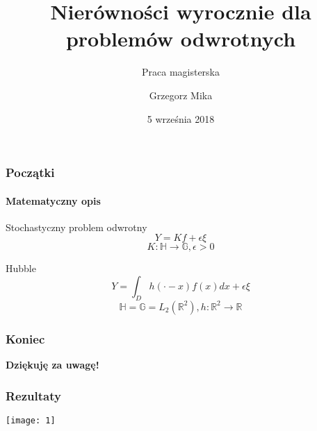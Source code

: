 \documentclass{beamer}
\title{Nierówności wyrocznie dla problemów odwrotnych}
\subtitle{Praca magisterska}
\author{Grzegorz Mika}
\institute{Wydział Matematyki Stosowanej}
\date{5 września 2018}
\begin{document}
\titleframe[pl]


\begin{frame}\frametitle{Początki}\framesubtitle{Matematyczny opis}

\begin{block}{Stochastyczny problem odwrotny}
\begin{displaymath}
Y=Kf+\epsilon\xi
\end{displaymath}
\begin{displaymath}
K\colon \mathbb{H}\to \mathbb{G}, \epsilon>0
\end{displaymath}
\end{block}
\begin{block}{Hubble}
\begin{displaymath}
Y=\int_Dh(\cdot-x)f(x)dx+\epsilon\xi
\end{displaymath}
\begin{displaymath}
\mathbb{H}= \mathbb{G}=L_2(\mathbb{R}^2), h\colon \mathbb{R}^2\to \mathbb{R}
\end{displaymath}
\end{block}
\end{frame}



\begin{frame}\frametitle{Koniec}
\begin{center}
\huge{\textbf{Dziękuję za uwagę!}}
\end{center}
\end{frame}
\begin{frame}\frametitle{Rezultaty}
\begin{center}
\texttt{[image: 1]}
\end{center}
\end{frame}
\end{document}
